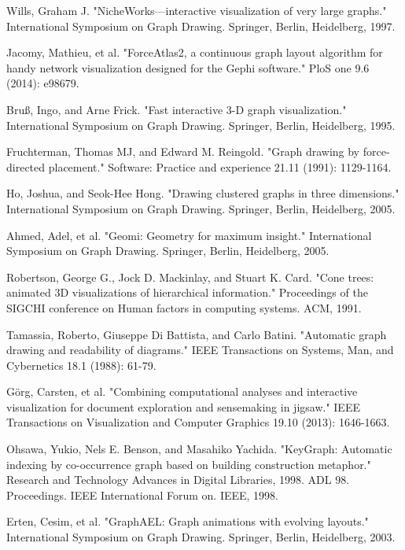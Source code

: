 \begin{thebibliography}{99}
 Wills, Graham J. "NicheWorks—interactive visualization of very large graphs." International Symposium on Graph Drawing. Springer, Berlin, Heidelberg, 1997.

 Jacomy, Mathieu, et al. "ForceAtlas2, a continuous graph layout algorithm for handy network visualization designed for the Gephi software." PloS one 9.6 (2014): e98679.

 Bruß, Ingo, and Arne Frick. "Fast interactive 3-D graph visualization." International Symposium on Graph Drawing. Springer, Berlin, Heidelberg, 1995.

 Fruchterman, Thomas MJ, and Edward M. Reingold. "Graph drawing by force‐directed placement." Software: Practice and experience 21.11 (1991): 1129-1164.

 Ho, Joshua, and Seok-Hee Hong. "Drawing clustered graphs in three dimensions." International Symposium on Graph Drawing. Springer, Berlin, Heidelberg, 2005.

 Ahmed, Adel, et al. "Geomi: Geometry for maximum insight." International Symposium on Graph Drawing. Springer, Berlin, Heidelberg, 2005.

 Robertson, George G., Jock D. Mackinlay, and Stuart K. Card. "Cone trees: animated 3D visualizations of hierarchical information." Proceedings of the SIGCHI conference on Human factors in computing systems. ACM, 1991.

 Tamassia, Roberto, Giuseppe Di Battista, and Carlo Batini. "Automatic graph drawing and readability of diagrams." IEEE Transactions on Systems, Man, and Cybernetics 18.1 (1988): 61-79.

 Görg, Carsten, et al. "Combining computational analyses and interactive visualization for document exploration and sensemaking in jigsaw." IEEE Transactions on Visualization and Computer Graphics 19.10 (2013): 1646-1663.

 Ohsawa, Yukio, Nels E. Benson, and Masahiko Yachida. "KeyGraph: Automatic indexing by co-occurrence graph based on building construction metaphor." Research and Technology Advances in Digital Libraries, 1998. ADL 98. Proceedings. IEEE International Forum on. IEEE, 1998.

 Erten, Cesim, et al. "GraphAEL: Graph animations with evolving layouts." International Symposium on Graph Drawing. Springer, Berlin, Heidelberg, 2003.


\end{thebibliography}
